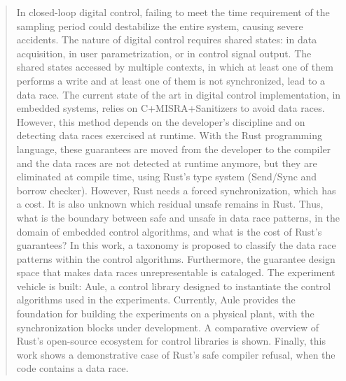 \begin{abstract}

In closed-loop digital control, failing to meet the time requirement of the sampling period could destabilize the entire system, causing severe accidents. The nature of digital control requires shared states: in data acquisition, in user parametrization, or in control signal output. The shared states accessed by multiple contexts, in which at least one of them performs a write and at least one of them is not synchronized, lead to a data race. The current state of the art in digital control implementation, in embedded systems, relies on C+MISRA+Sanitizers to avoid data races. However, this method depends on the developer's discipline and on detecting data races exercised at runtime. With the Rust programming language, these guarantees are moved from the developer to the compiler and the data races are not detected at runtime anymore, but they are eliminated at compile time, using Rust's type system (Send/Sync and borrow checker). However, Rust needs a forced synchronization, which has a cost. It is also unknown which residual unsafe remains in Rust. Thus, what is the boundary between safe and unsafe in data race patterns, in the domain of embedded control algorithms, and what is the cost of Rust's guarantees? In this work, a taxonomy is proposed to classify the data race patterns within the control algorithms. Furthermore, the guarantee design space that makes data races unrepresentable is cataloged. The experiment vehicle is built: Aule, a control library designed to instantiate the control algorithms used in the experiments. Currently, Aule provides the foundation for building the experiments on a physical plant, with the synchronization blocks under development. A comparative overview of Rust's open-source ecosystem for control libraries is shown. Finally, this work shows a demonstrative case of Rust's safe compiler refusal, when the code contains a data race.

\end{abstract}

